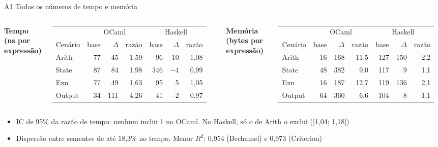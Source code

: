\documentclass[aspectratio=169,10pt]{beamer}
\newcommand{\oc}[1]{\textcolor{ocamlc}{#1}}
\newcommand{\hs}[1]{\textcolor{haskellc}{#1}}
\begin{document}
\begin{frame}{A1 \textperiodcentered{} Todos os números de tempo e memória}
  \begin{columns}[T]
    \centering \textbf{Tempo (ns por expressão)}\\[2pt]
    \footnotesize
    \begin{tabular}{lrrrrrr}
      \toprule
      & \multicolumn{3}{c}{\oc{OCaml}} & \multicolumn{3}{c}{\hs{Haskell}} \\
      \cmidrule(lr){2-4}\cmidrule(lr){5-7}
      Cenário & base & $\Delta$ & razão & base & $\Delta$ & razão \\
      \midrule
      Arith & 77 & 45 & 1,59 & 96 & 10 & 1,08 \\
      State & 87 & 84 & 1,98 & 346 & $-4$ & 0,99 \\
      Exn & 77 & 49 & 1,63 & 95 & 5 & 1,05 \\
      Output & 34 & 111 & 4,26 & 41 & $-2$ & 0,97 \\
      \bottomrule
    \end{tabular}
    \centering \textbf{Memória (bytes por expressão)}\\[2pt]
    \footnotesize
    \begin{tabular}{lrrrrrr}
      \toprule
      & \multicolumn{3}{c}{\oc{OCaml}} & \multicolumn{3}{c}{\hs{Haskell}} \\
      \cmidrule(lr){2-4}\cmidrule(lr){5-7}
      Cenário & base & $\Delta$ & razão & base & $\Delta$ & razão \\
      \midrule
      Arith & 16 & 168 & 11,5 & 127 & 150 & 2,2 \\
      State & 48 & 382 & 9,0 & 117 & 9 & 1,1 \\
      Exn & 16 & 187 & 12,7 & 119 & 136 & 2,1 \\
      Output & 64 & 360 & 6,6 & 104 & 8 & 1,1 \\
      \bottomrule
    \end{tabular}
  \end{columns}
  \vspace{10pt}
  \begin{itemize}
    \item IC de 95\% da razão de tempo: nenhum inclui 1 no OCaml. No Haskell, só o de Arith o exclui ([1,04; 1,18])
    \item Dispersão entre sementes de até 18,3\% no tempo. Menor $R^2$: 0,954 (Bechamel) e 0,973 (Criterion)
  \end{itemize}
\end{frame}
\end{document}

